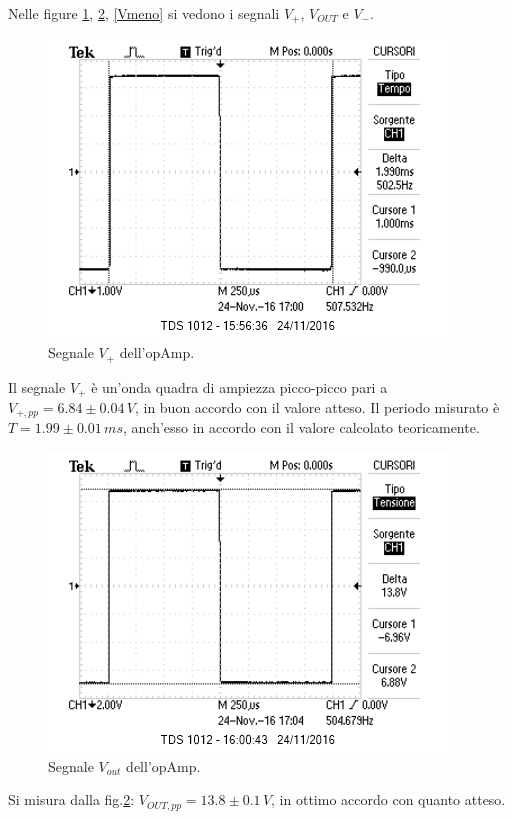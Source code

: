 \documentclass[10pt,a4paper]{article}
\begin{document}
Nelle figure \ref{Vpiu}, \ref{Vout}, \ref{Vmeno} si vedono i segnali $V_{+}$, $V_{OUT}$ e $V_{-}$.

\begin{figure}[htb!]
\centering
\includegraphics[scale=1.0]{immagini/multivibratoreVPIU.png}
\caption{Segnale $V_{+}$ dell'opAmp.}
\label{Vpiu}
\end{figure}

Il segnale $V_{+}$ è un'onda quadra di ampiezza picco-picco pari a $V_{+, pp} = 6.84 \pm 0.04\, V$, in buon accordo con il valore atteso. Il periodo misurato è $T = 1.99 \pm 0.01 \, ms$, anch'esso in accordo con il valore calcolato teoricamente.


\begin{figure}[htb!]
\centering
\includegraphics[scale=1.0]{immagini/multivibratoreVOUT.png}
\caption{Segnale $V_{out}$ dell'opAmp.}
\label{Vout}
\end{figure}

Si misura dalla fig.\ref{Vout}: $V_{OUT, pp} = 13.8 \pm 0.1\, V$, in ottimo accordo con quanto atteso.
\end{document}
